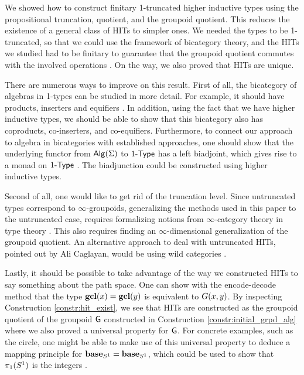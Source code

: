 We showed how to construct finitary 1-truncated higher inductive types using the propositional truncation, quotient, and the groupoid quotient.
This reduces the existence of a general class of HITs to simpler ones.
We needed the types to be 1-truncated, so that we could use the framework of bicategory theory,
and the HITs we studied had to be finitary to guarantee that the groupoid quotient
commutes with the involved operations \cite{DBLP:journals/mscs/ChapmanUV19}.
On the way, we also proved that HITs are unique.

There are numerous ways to improve on this result.
First of all, the bicategory of algebras in 1-types can be studied in more detail.
For example, it should have products, inserters and equifiers \cite{power1991characterization}.
In addition, using the fact that we have higher inductive types, we should be able to show
that this bicategory also has coproducts, co-inserters, and co-equifiers.
Furthermore, to connect our approach to algebra in bicategories with established approaches,
one should show that the underlying functor from $\mathsf{Alg}(\Sigma)$  to $1\mbox{-}\mathsf{Type}$ has a left biadjoint,
which gives rise to a monad on $1\mbox{-}\mathsf{Type}$ \cite{blackwell1989two,LACK2000179}.
The biadjunction could be constructed using higher inductive types.

Second of all, one would like to get rid of the truncation level.
Since untruncated types correspond to $\infty$-groupoids,
generalizing the methods used in this paper to the untruncated case,
requires formalizing notions from $\infty$-category theory in type theory
\cite{DBLP:conf/csl/AltenkirchR12,DBLP:journals/pacmpl/CapriottiK18,FinsterM17}.
This also requires finding an $\infty$-dimensional generalization of the groupoid quotient.
An alternative approach to deal with untruncated HITs, pointed out by Ali Caglayan,
would be using wild categories \cite{DBLP:conf/tlca/HirschowitzHT15,KrausRaumer}.

Lastly, it should be possible to take advantage of the way we constructed HITs
to say something about the path space.
One can show with the encode-decode method that the type $\operatorname{\mathbf{gcl}}(x) = \operatorname{\mathbf{gcl}}(y)$ is equivalent
to $G(x, y)$.
By inspecting Construction \ref{constr:hit_exist}, we see that HITs are constructed
as the groupoid quotient of the groupoid $\mathsf{G}$ constructed in Construction \ref{constr:initial_grpd_alg}
where we also proved a universal property for $\mathsf{G}$.
For concrete examples, such as the circle, one might be able to make use of this
universal property to deduce a mapping principle for $\operatorname{\mathbf{base}}_{S^1} = \operatorname{\mathbf{base}}_{S^1}$,
which could be used to show that $\pi_1(S^1)$ is the integers \cite{LicataS13}.